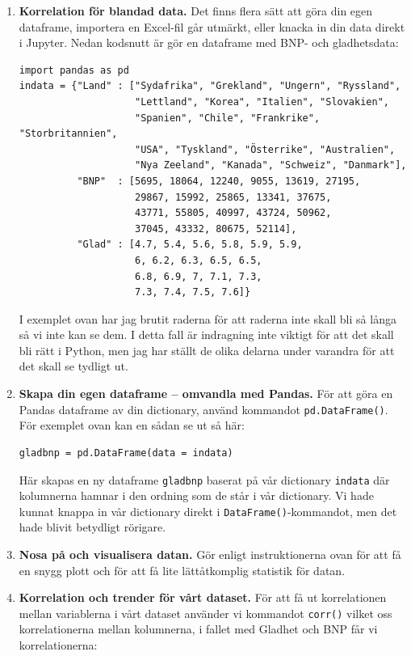 \documentclass{article}
\begin{document}
\begin{enumerate}
    \item \textbf{Korrelation för blandad data.} Det finns flera sätt att göra din egen dataframe, importera en Excel-fil går utmärkt, eller knacka in din data direkt i Jupyter. Nedan kodsnutt är gör en dataframe med BNP- och gladhetsdata:
\begin{verbatim}
import pandas as pd
indata = {"Land" : ["Sydafrika", "Grekland", "Ungern", "Ryssland",
                    "Lettland", "Korea", "Italien", "Slovakien",
                    "Spanien", "Chile", "Frankrike", "Storbritannien",
                    "USA", "Tyskland", "Österrike", "Australien", 
                    "Nya Zeeland", "Kanada", "Schweiz", "Danmark"], 
          "BNP"  : [5695, 18064, 12240, 9055, 13619, 27195, 
                    29867, 15992, 25865, 13341, 37675, 
                    43771, 55805, 40997, 43724, 50962, 
                    37045, 43332, 80675, 52114],
          "Glad" : [4.7, 5.4, 5.6, 5.8, 5.9, 5.9, 
                    6, 6.2, 6.3, 6.5, 6.5, 
                    6.8, 6.9, 7, 7.1, 7.3, 
                    7.3, 7.4, 7.5, 7.6]}        
    \end{verbatim}
    I exemplet ovan har jag brutit raderna för att raderna inte skall bli så långa så vi inte kan se dem. I detta fall är indragning inte viktigt för att det skall bli rätt i Python, men jag har ställt de olika delarna under varandra för att det skall se tydligt ut.
    \item \textbf{Skapa din egen dataframe – omvandla med Pandas.} För att göra en Pandas dataframe av din dictionary, använd kommandot \verb+pd.DataFrame()+. För exemplet ovan kan en sådan se ut så här:
    \begin{verbatim}
gladbnp = pd.DataFrame(data = indata)        
    \end{verbatim}
Här skapas en ny dataframe \verb+gladbnp+ baserat på vår dictionary \verb+indata+ där kolumnerna hamnar i den ordning som de står i vår dictionary. Vi hade kunnat knappa in vår dictionary direkt i \verb+DataFrame()+-kommandot, men det hade blivit betydligt rörigare. 
\item \textbf{Nosa på och visualisera datan.} Gör enligt instruktionerna ovan för att få en snygg plott och för att få lite lättåtkomplig statistik för datan. 
\item \textbf{Korrelation och trender för vårt dataset.} För att få ut korrelationen mellan variablerna i vårt dataset använder vi  kommandot \verb+corr()+ vilket oss korrelationerna mellan kolumnerna, i fallet med Gladhet och BNP får vi korrelationerna:

\end{enumerate}
\end{document}
